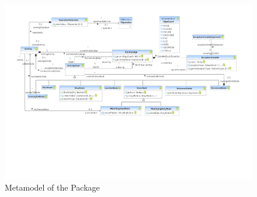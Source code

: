 %
%

\begin{figure}[htbp]
  \centering
  \includegraphics[width=\textheight,
  angle=90]{figures/A_technical-reference/packages/modeling_activities/activities}
  \caption{Metamodel of the  Package}
  \label{fig:MM:activities}
\end{figure}
